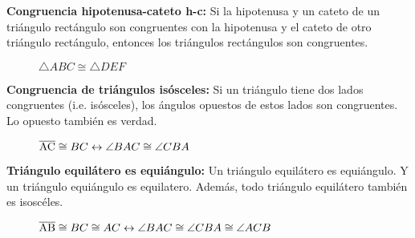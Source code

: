 \clearpage

\begin{postulate}{\textbf{Congruencia hipotenusa-cateto h-c:}}
    Si la hipotenusa y un cateto de un triángulo rectángulo son congruentes con la hipotenusa y el cateto de otro triángulo rectángulo, entonces los triángulos rectángulos son congruentes.

    \begin{figure}[h!]

        \centering

        \begin{subfigure}[b]{.5\textwidth}
            \centering
            
            \label{fig:congruence-hlc1}
        \end{subfigure}%
        \begin{subfigure}[b]{.5\textwidth}
            \centering
            
            \label{fig:congruence-hlc2}
        \end{subfigure}

        \centering
        \caption{$\triangle{ABC} \cong \triangle{DEF}$}
        \label{fig:congruencia-hlc}
        
    \end{figure}    
        
\end{postulate}

\begin{theorem}{\textbf{Congruencia de triángulos isósceles:}}
    Si un triángulo tiene dos lados congruentes (i.e. isósceles), los ángulos opuestos de estos lados son congruentes. Lo opuesto también es verdad.

        \begin{figure}[!h]
            \centering
            
            \label{fig:isosceles}
            \caption{$\overline{\rm AC} \cong {BC} \leftrightarrow \angle{BAC} \cong \angle{CBA}$}            
        \end{figure}
\end{theorem}

\begin{theorem}{\textbf{Triángulo equilátero es equiángulo:}}
    Un triángulo equilátero es equiángulo. Y un triángulo equiángulo es equilatero. Además, todo triángulo equilátero también es isoscéles.

    \begin{figure}[!h]
        \centering
        
        \label{fig:equilateral}
        \caption{$\overline{\rm AB} \cong {BC}  \cong {AC} \leftrightarrow \angle{BAC} \cong \angle{CBA} \cong \angle{ACB}$}            
    \end{figure}
    
\end{theorem}

